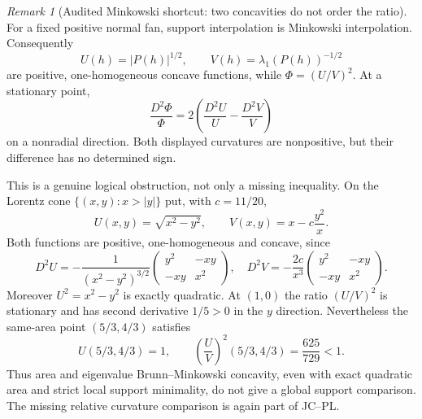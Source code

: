 \documentclass[11pt]{amsart}
\numberwithin{equation}{section}
\theoremstyle{definition}
\theoremstyle{remark}
\newtheorem{remark}[theorem]{Remark}
\begin{document}
\begin{remark}[Audited Minkowski shortcut: two concavities do not order the ratio]
For a fixed positive normal fan, support interpolation is Minkowski
interpolation.  Consequently
\[
 U(h)=|P(h)|^{1/2},
 \qquad V(h)=\lambda_1(P(h))^{-1/2}
\]
are positive, one-homogeneous concave functions, while
$\Phi=(U/V)^2$.  At a stationary point,
\[
 \frac{D^2\Phi}{\Phi}
 =2\left(\frac{D^2U}{U}-\frac{D^2V}{V}\right)
\]
on a nonradial direction.  Both displayed curvatures are nonpositive,
but their difference has no determined sign.

This is a genuine logical obstruction, not only a missing inequality.
On the Lorentz cone $\{(x,y):x>|y|\}$ put, with $c=11/20$,
\[
 U(x,y)=\sqrt{x^2-y^2},
 \qquad V(x,y)=x-c\frac{y^2}{x}.
\]
Both functions are positive, one-homogeneous and concave, since
\[
 D^2U=-\frac1{(x^2-y^2)^{3/2}}
 \begin{pmatrix}y^2&-xy\\-xy&x^2\end{pmatrix},
 \quad
 D^2V=-\frac{2c}{x^3}
 \begin{pmatrix}y^2&-xy\\-xy&x^2\end{pmatrix}.
\]
Moreover $U^2=x^2-y^2$ is exactly quadratic.  At $(1,0)$ the ratio
$(U/V)^2$ is stationary and has second derivative $1/5>0$ in the
$y$ direction.  Nevertheless the same-area point $(5/3,4/3)$ satisfies
\[
 U(5/3,4/3)=1,
 \qquad
 \left(\frac UV\right)^2(5/3,4/3)=\frac{625}{729}<1.
\]
Thus area and eigenvalue Brunn--Minkowski concavity, even with exact
quadratic area and strict local support minimality, do not give a global
support comparison.  The missing relative curvature comparison is again
part of JC--PL.
\end{remark}
\end{document}
